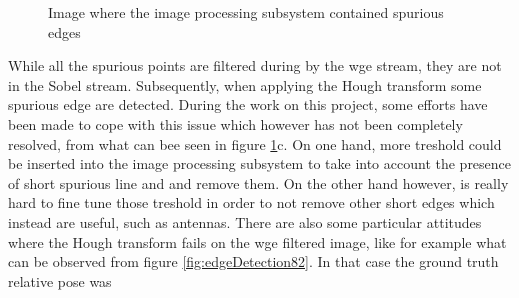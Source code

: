 \begin{figure}[htbp]
  \centering
  \qquad
  \qquad
  \qquad
  \caption{Image where the image processing subsystem contained spurious edges}
  \label{fig:edgeDetection204}
\end{figure}

While all the spurious points are filtered during by the \acrshort{wge} stream, they are not in the Sobel stream. Subsequently, when applying the Hough transform some spurious edge are detected. During the work on this project, some efforts have been made to cope with this issue which however has not been completely resolved, from what can bee seen in figure \ref{fig:edgeDetection204}c. On one hand, more treshold could be inserted into the image processing subsystem to take into account the presence of short spurious line and and remove them. On the other hand however, is really hard to fine tune those treshold in order to not remove other short edges which instead are useful, such as antennas.
There are also some particular attitudes where the Hough transform fails on the \acrshort{wge} filtered image, like for example what can be observed from figure \ref{fig:edgeDetection82}. In that case the ground truth relative pose was

